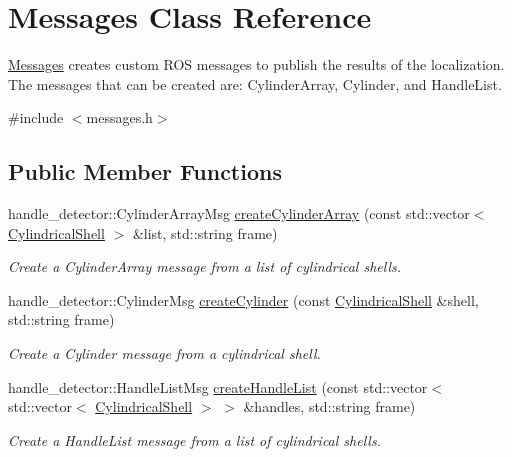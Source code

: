 \hypertarget{class_messages}{\section{\-Messages \-Class \-Reference}
\label{class_messages}
}


\hyperlink{class_messages}{\-Messages} creates custom \-R\-O\-S messages to publish the results of the localization. \-The messages that can be created are\-: \-Cylinder\-Array, \-Cylinder, and \-Handle\-List.  




{\ttfamily \#include $<$messages.\-h$>$}

\subsection*{\-Public \-Member \-Functions}
\begin{DoxyCompactItemize}
\item 
handle\-\_\-detector\-::\-Cylinder\-Array\-Msg \hyperlink{class_messages_abc1376daa7b3d449a82ca0b4ffb5d40d}{create\-Cylinder\-Array} (const std\-::vector$<$ \hyperlink{class_cylindrical_shell}{\-Cylindrical\-Shell} $>$ \&list, std\-::string frame)
\begin{DoxyCompactList}\small\item\em \-Create a \-Cylinder\-Array message from a list of cylindrical shells. \end{DoxyCompactList}\item 
handle\-\_\-detector\-::\-Cylinder\-Msg \hyperlink{class_messages_ad29146f350b7bca4fd3c0286b4c1a441}{create\-Cylinder} (const \hyperlink{class_cylindrical_shell}{\-Cylindrical\-Shell} \&shell, std\-::string frame)
\begin{DoxyCompactList}\small\item\em \-Create a \-Cylinder message from a cylindrical shell. \end{DoxyCompactList}\item 
handle\-\_\-detector\-::\-Handle\-List\-Msg \hyperlink{class_messages_a33d25e422df9d14d4344a4cecdf413fa}{create\-Handle\-List} (const std\-::vector$<$ std\-::vector$<$ \hyperlink{class_cylindrical_shell}{\-Cylindrical\-Shell} $>$ $>$ \&handles, std\-::string frame)
\begin{DoxyCompactList}\small\item\em \-Create a \-Handle\-List message from a list of cylindrical shells. \end{DoxyCompactList}\end{DoxyCompactItemize}


